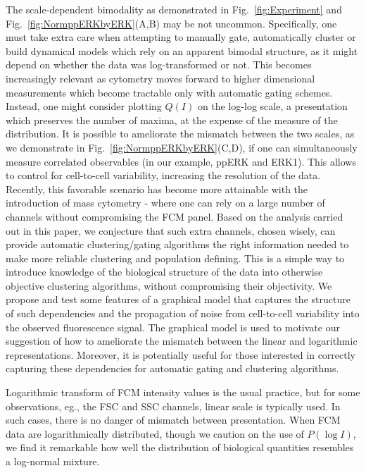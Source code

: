 \documentclass[11pt,a4paper,final]{article}
\begin{document}

\smallskip
The scale-dependent bimodality as demonstrated in Fig.~\ref{fig:Experiment} and Fig.~\ref{fig:NormppERKbyERK}(A,B) may be not uncommon. Specifically, one must take extra care when attempting to manually gate, automatically cluster or build dynamical models which rely on an apparent bimodal structure, as it might depend on whether the data was log-transformed or not. This becomes increasingly relevant as cytometry moves forward to higher dimensional measurements which become tractable only with automatic gating schemes. Instead, one might consider plotting $Q(I)$ on the log-log scale, a presentation which preserves the number of maxima, at the expense of the measure of the distribution. It is possible to ameliorate the mismatch between the two scales, as we demonstrate in Fig.~\ref{fig:NormppERKbyERK}(C,D), if one can simultaneously measure correlated observables (in our example, ppERK and ERK1). This allows to control for cell-to-cell variability, increasing the resolution of the data. Recently, this favorable scenario has become more attainable with the introduction of mass cytometry - where one can rely on a large number of channels without compromising the FCM panel. Based on the analysis carried out in this paper, we conjecture that such extra channels, chosen wisely, can provide automatic clustering/gating algorithms the right information needed to make more reliable clustering and population defining. This is a simple way to introduce knowledge of the biological structure of the data into otherwise objective clustering algorithms, without compromising their objectivity. We propose and test some features of a graphical model that captures the structure of such dependencies and the propagation of noise from cell-to-cell variability into the observed fluorescence signal. The graphical model is used to motivate our suggestion of how to ameliorate the mismatch between the linear and logarithmic representations. Moreover, it is potentially useful for those interested in correctly capturing these dependencies for automatic gating and clustering algorithms. 

\smallskip 
Logarithmic transform of FCM intensity values is the usual practice, but for some observations, eg., the FSC and SSC channels, linear scale is typically used. In such cases, there is no danger of mismatch between presentation. When FCM data are logarithmically distributed, though we caution on the use of $P(\log I)$, we find it remarkable how well the distribution of biological quantities resembles a log-normal mixture. 
\end{document}

